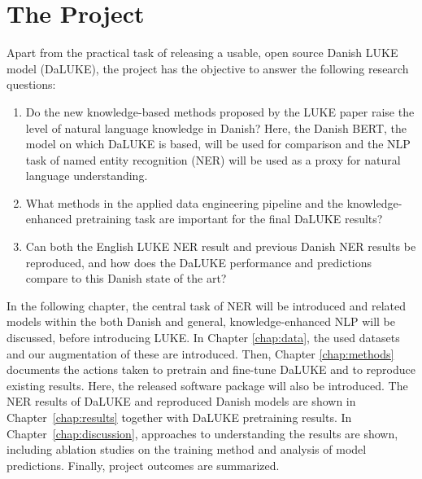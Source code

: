 \documentclass[main.tex]{subfiles}
\begin{document}
\section{The Project}%
\label{sec:project}
Apart from the practical task of releasing a usable, open source Danish LUKE model (DaLUKE), the project has the objective to answer the following research questions:
\begin{enumerate}[itemsep=.5em]
    \item
        Do the new knowledge-based methods proposed by the LUKE paper raise the level of natural language knowledge in Danish?
        Here, the Danish BERT, the model on which DaLUKE is based, will be used for comparison and the NLP task of named entity recognition (NER) will be used as a proxy for natural language understanding.
    \item
        What methods in the applied data engineering pipeline and the knowledge-enhanced pretraining task are important for the final DaLUKE results?
    \item
        Can both the English LUKE NER result and previous Danish NER results be reproduced, and how does the DaLUKE performance and predictions compare to this Danish state of the art?
\end{enumerate}
In the following chapter, the central task of NER will be introduced and related models within the both Danish and general, knowledge-enhanced NLP will be discussed, before introducing LUKE.
In Chapter \ref{chap:data}, the used datasets and our augmentation of these are introduced.
Then, Chapter \ref{chap:methods} documents the actions taken to pretrain and fine-tune DaLUKE and to reproduce existing results.
Here, the released software package  will also be introduced.
The NER results of DaLUKE and reproduced Danish models are shown in Chapter~\ref{chap:results} together with DaLUKE pretraining results.
In Chapter~\ref{chap:discussion}, approaches to understanding the results are shown, including ablation studies on the training method and analysis of model predictions.
Finally, project outcomes are summarized.
\end{document}

